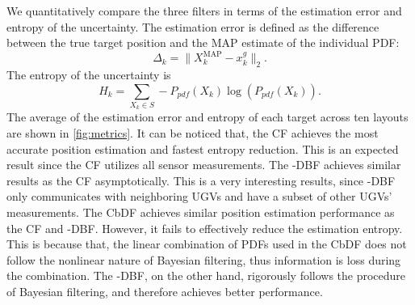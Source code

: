 	We quantitatively compare the three filters in terms of the estimation error and entropy of the uncertainty.
	The estimation error is defined as the difference between the true target position and the MAP estimate of the individual PDF:
	\small\begin{equation*}
		\Delta_k = \|X^\text{MAP}_k-x^g_k\|_2.
	\end{equation*}\normalsize
	The entropy of the uncertainty is
	\small\begin{equation*}
		H_k = \sum\limits_{X_k\in S} -P_{pdf}(X_k)\log(P_{pdf}(X_k)).
	\end{equation*}\normalsize
	The average of the estimation error and entropy of each target across ten layouts are shown in \cref{fig:metrics}.
	It can be noticed that, the CF achieves the most accurate position estimation and fastest entropy reduction. 
	This is an expected result since the CF utilizes all sensor measurements.
	The \proto-DBF achieves similar results as the CF asymptotically. 
	This is a very interesting results, since \proto-DBF only communicates with neighboring UGVs and have a subset of other UGVs' measurements.
	The CbDF achieves similar position estimation performance as the CF and \proto-DBF. 
	However, it fails to effectively reduce the estimation entropy.
	This is because that, the linear combination of PDFs used in the CbDF does not follow the nonlinear nature of Bayesian filtering, thus information is loss during the combination.
	The \proto-DBF, on the other hand, rigorously follows the procedure of Bayesian filtering, and therefore achieves better performance.
	
